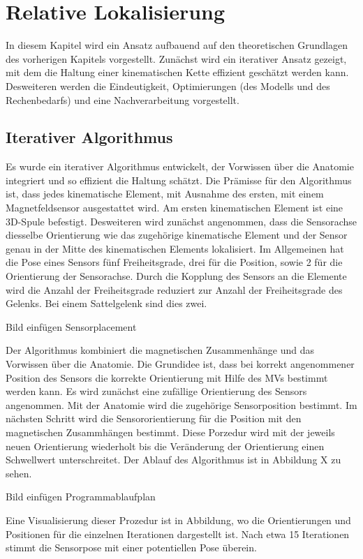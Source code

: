 \section{Relative Lokalisierung}
In diesem Kapitel wird ein Ansatz aufbauend auf den theoretischen Grundlagen des vorherigen Kapitels vorgestellt. Zunächst wird ein iterativer Ansatz gezeigt, mit dem die Haltung einer kinematischen Kette effizient geschätzt werden kann. Desweiteren werden die Eindeutigkeit, Optimierungen (des Modells und des Rechenbedarfs) und eine Nachverarbeitung vorgestellt. 
	\subsection{Iterativer Algorithmus}
	Es wurde ein iterativer Algorithmus entwickelt, der Vorwissen über die Anatomie integriert und so effizient die Haltung schätzt. Die Prämisse für den Algorithmus ist, dass jedes kinematische Element, mit Ausnahme des ersten, mit einem Magnetfeldsensor ausgestattet wird. Am ersten kinematischen Element ist eine 3D-Spule befestigt. Desweiteren wird zunächst angenommen, dass die Sensorachse diesselbe Orientierung wie das zugehörige kinematische Element und der Sensor genau in der Mitte des kinematischen Elements lokalisiert. Im Allgemeinen hat die Pose eines Sensors fünf Freiheitsgrade, drei für die Position, sowie 2 für die Orientierung der Sensorachse. Durch die Kopplung des Sensors an die Elemente wird die Anzahl der Freiheitsgrade reduziert zur Anzahl der Freiheitsgrade des Gelenks. Bei einem Sattelgelenk sind dies zwei.

Bild einfügen Sensorplacement 

	Der Algorithmus kombiniert die magnetischen Zusammenhänge und das Vorwissen über die Anatomie. Die Grundidee ist, dass bei korrekt angenommener Position des Sensors die korrekte Orientierung mit Hilfe des MVs bestimmt werden kann. Es wird zunächst eine zufällige Orientierung des Sensors angenommen. Mit der Anatomie wird die zugehörige Sensorposition bestimmt. Im nächsten Schritt wird die Sensororientierung für die Position mit den magnetischen Zusammhängen bestimmt. Diese Porzedur wird mit der jeweils neuen Orientierung wiederholt bis die Veränderung der Orientierung einen Schwellwert unterschreitet. Der Ablauf des Algorithmus ist in Abbildung X zu sehen.

Bild einfügen Programmablaufplan 

	Eine Visualisierung dieser Prozedur ist in Abbildung, wo die Orientierungen und Positionen für die einzelnen Iterationen dargestellt ist. Nach etwa 15 Iterationen stimmt die Sensorpose mit einer potentiellen Pose überein.

